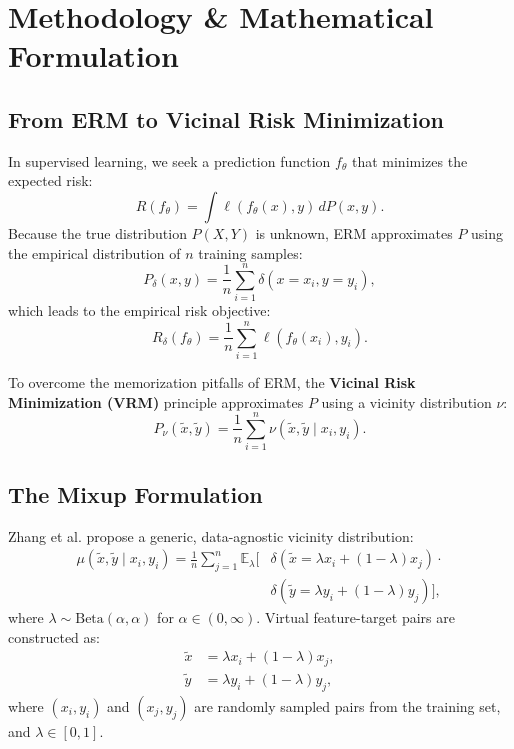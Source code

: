 \documentclass[conference]{IEEEtran}
\begin{document}
\section{Methodology \& Mathematical Formulation}

\subsection{From ERM to Vicinal Risk Minimization}
In supervised learning, we seek a prediction function $f_\theta$ that minimizes the expected risk:
\begin{equation}
R(f_\theta) = \int \ell(f_\theta(x), y) \, dP(x, y). \label{eq:expected_risk}
\end{equation}
Because the true distribution $P(X, Y)$ is unknown, ERM approximates $P$ using the empirical distribution of $n$ training samples:
\begin{equation}
P_\delta(x, y) = \frac{1}{n} \sum_{i=1}^n \delta(x = x_i, y = y_i), \label{eq:empirical_distribution}
\end{equation}
which leads to the empirical risk objective:
\begin{equation}
R_\delta(f_\theta) = \frac{1}{n} \sum_{i=1}^n \ell(f_\theta(x_i), y_i). \label{eq:erm_risk}
\end{equation}

To overcome the memorization pitfalls of ERM, the \textbf{Vicinal Risk Minimization (VRM)} principle approximates $P$ using a vicinity distribution $\nu$:
\begin{equation}
P_\nu(\tilde{x}, \tilde{y}) = \frac{1}{n} \sum_{i=1}^n \nu(\tilde{x}, \tilde{y} \mid x_i, y_i). \label{eq:vrm_dist}
\end{equation}

\subsection{The Mixup Formulation}
Zhang et al. propose a generic, data-agnostic vicinity distribution:
\begin{align}
\mu(\tilde{x}, \tilde{y} \mid x_i, y_i) = \frac{1}{n} \sum_{j=1}^n \mathbb{E}_\lambda [ &\delta(\tilde{x} = \lambda x_i + (1-\lambda)x_j) \cdot \nonumber \\
&\delta(\tilde{y} = \lambda y_i + (1-\lambda)y_j) ], \label{eq:mixup_dist}
\end{align}
where $\lambda \sim \text{Beta}(\alpha, \alpha)$ for $\alpha \in (0, \infty)$. Virtual feature-target pairs are constructed as:
\begin{align}
\tilde{x} &= \lambda x_i + (1 - \lambda) x_j, \label{eq:mixup_x} \\
\tilde{y} &= \lambda y_i + (1 - \lambda) y_j, \label{eq:mixup_y}
\end{align}
where $(x_i, y_i)$ and $(x_j, y_j)$ are randomly sampled pairs from the training set, and $\lambda \in [0, 1]$.
\end{document}
